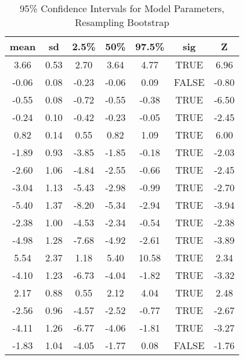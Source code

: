 \begin{table}[H]
\centering
\begin{tabular}{|c|c|c|c|c|c|c|}
  \hline
  \textbf{mean} & \textbf{sd} & \textbf{2.5\%} & \textbf{50\%} & \textbf{97.5\%} & \textbf{sig} & \textbf{Z} \\ 
  \hline
3.66 & 0.53 & 2.70 & 3.64 & 4.77 & TRUE & 6.96 \\ 
  -0.06 & 0.08 & -0.23 & -0.06 & 0.09 & FALSE & -0.80 \\ 
  -0.55 & 0.08 & -0.72 & -0.55 & -0.38 & TRUE & -6.50 \\ 
  -0.24 & 0.10 & -0.42 & -0.23 & -0.05 & TRUE & -2.45 \\ 
  0.82 & 0.14 & 0.55 & 0.82 & 1.09 & TRUE & 6.00 \\ 
  -1.89 & 0.93 & -3.85 & -1.85 & -0.18 & TRUE & -2.03 \\ 
  -2.60 & 1.06 & -4.84 & -2.55 & -0.66 & TRUE & -2.45 \\ 
  -3.04 & 1.13 & -5.43 & -2.98 & -0.99 & TRUE & -2.70 \\ 
  -5.40 & 1.37 & -8.20 & -5.34 & -2.94 & TRUE & -3.94 \\ 
  -2.38 & 1.00 & -4.53 & -2.34 & -0.54 & TRUE & -2.38 \\ 
  -4.98 & 1.28 & -7.68 & -4.92 & -2.61 & TRUE & -3.89 \\ 
  5.54 & 2.37 & 1.18 & 5.40 & 10.58 & TRUE & 2.34 \\ 
  -4.10 & 1.23 & -6.73 & -4.04 & -1.82 & TRUE & -3.32 \\ 
  2.17 & 0.88 & 0.55 & 2.12 & 4.04 & TRUE & 2.48 \\ 
  -2.56 & 0.96 & -4.57 & -2.52 & -0.77 & TRUE & -2.67 \\ 
  -4.11 & 1.26 & -6.77 & -4.06 & -1.81 & TRUE & -3.27 \\ 
  -1.83 & 1.04 & -4.05 & -1.77 & 0.08 & FALSE & -1.76 \\ 
   \hline
\end{tabular}
   \caption{95\% Confidence Intervals for Model Parameters, Resampling Bootstrap}
\end{table}
